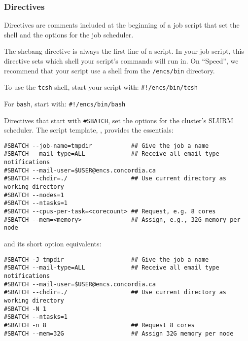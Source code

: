 ﻿%
\subsubsection{Directives}
\label{sect:directives}

Directives are comments included at the beginning of a job script that set the shell 
and the options for the job scheduler. 

The shebang directive is always the first line of a script. In your job script, 
this directive sets which shell your script's commands will run in. On ``Speed'', 
we recommend that your script use a shell from the \texttt{/encs/bin} directory. 

To use the \texttt{tcsh} shell, start your script with: \verb|#!/encs/bin/tcsh|

For \texttt{bash}, start with: \verb|#!/encs/bin/bash|

Directives that start with \verb|#SBATCH|, set the options for the cluster's 
SLURM scheduler. The script template, , 
provides the essentials:

\begin{verbatim}
#SBATCH --job-name=tmpdir           ## Give the job a name
#SBATCH --mail-type=ALL             ## Receive all email type notifications
#SBATCH --mail-user=$USER@encs.concordia.ca
#SBATCH --chdir=./                  ## Use current directory as working directory
#SBATCH --nodes=1
#SBATCH --ntasks=1
#SBATCH --cpus-per-task=<corecount> ## Request, e.g. 8 cores
#SBATCH --mem=<memory>              ## Assign, e.g., 32G memory per node 
\end{verbatim}

and its short option equivalents:

\begin{verbatim}
#SBATCH -J tmpdir                   ## Give the job a name
#SBATCH --mail-type=ALL             ## Receive all email type notifications
#SBATCH --mail-user=$USER@encs.concordia.ca
#SBATCH --chdir=./                  ## Use current directory as working directory
#SBATCH -N 1
#SBATCH --ntasks=1
#SBATCH -n 8                        ## Request 8 cores
#SBATCH --mem=32G                   ## Assign 32G memory per node 
\end{verbatim}

